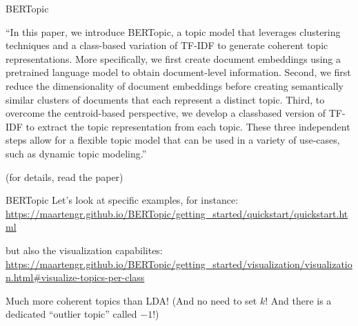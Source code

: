 	\begin{frame}{BERTopic \parencite{Grootendorst2022}}
	
	``In this paper, we introduce BERTopic, a topic model that leverages clustering techniques and a class-based variation of TF-IDF to generate coherent topic representations. More specifically, we first create document embeddings using a pretrained language model to obtain document-level information. Second, we first reduce the dimensionality of document embeddings before creating semantically similar clusters of documents that each represent a distinct topic. Third, to overcome the centroid-based perspective, we develop a classbased version of TF-IDF to extract the topic representation from each topic. These three independent steps allow for a flexible topic model that can be used in a variety of use-cases, such as dynamic topic modeling.''
	
	\tiny{(for details, read the paper)}
	
	\end{frame}
	
	
	
	
	\begin{frame}{BERTopic \parencite{Grootendorst2022}}
	  Let's look at specific examples, for instance:
	  \url{https://maartengr.github.io/BERTopic/getting_started/quickstart/quickstart.html}
	
	  but also the visualization capabilites:
	  \url{https://maartengr.github.io/BERTopic/getting_started/visualization/visualization.html#visualize-topics-per-class}
	\end{frame}
	
	
	
	
	\begin{frame}{Much more coherent topics than LDA!}
	  (And no need to set $k$! And there is a dedicated ``outlier topic'' called $-1$!)
	\end{frame}
	
